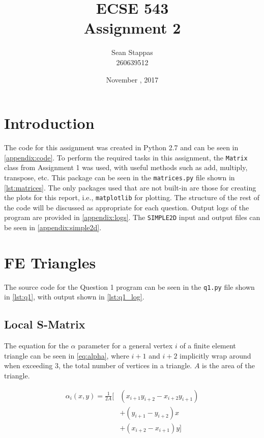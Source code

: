 \documentclass[a4paper,titlepage]{article}
\title{\textbf{ECSE 543 \\ Assignment 2}}
\author{Sean Stappas \\ 260639512}
\date{November \nth{20}, 2017}
\begin{document}
	\sloppy
	\maketitle
	
	\tableofcontents
	
	
	\twocolumn
	
	\section*{Introduction}
	
	The code for this assignment was created in Python 2.7 and can be seen in \autoref{appendix:code}. To perform the required tasks in this assignment, the \texttt{Matrix} class from Assignment 1 was used, with useful methods such as add, multiply, transpose, etc. This package can be seen in the \texttt{matrices.py} file shown in \autoref{lst:matrices}. The only packages used that are not built-in are those for creating the plots for this report, i.e., \texttt{matplotlib} for plotting. The structure of the rest of the code will be discussed as appropriate for each question. Output logs of the program are provided in \autoref{appendix:logs}. The \texttt{SIMPLE2D} input and output files can be seen in \autoref{appendix:simple2d}.
	
	\section{FE Triangles}
	
	The source code for the Question 1 program can be seen in the \texttt{q1.py} file shown in \cref{lst:q1}, with output shown in \cref{lst:q1_log}.
	
	\subsection{Local S-Matrix}
	
	The equation for the $\alpha$ parameter for a general vertex $i$ of a finite element triangle can be seen in \cref{eq:alpha}, where $i+1$ and $i+2$ implicitly wrap around when exceeding 3, the total number of vertices in a triangle. $A$ is the area of the triangle.
	
	\begin{equation} \label{eq:alpha}
		\begin{split}
			\alpha_i(x, y) = \frac{1}{2A} \big[
			& (x_{i+1}y_{i+2} - x_{i+2}y_{i+1}) \\
			& + (y_{i+1} - y_{i+2})x \\
			& + (x_{i+2} - x_{i+1})y \big]
		\end{split}
	\end{equation}
	
\end{document}
